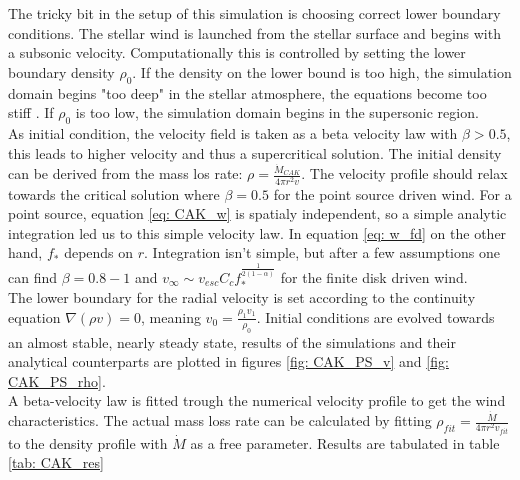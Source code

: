 The tricky bit in the setup of this simulation is choosing correct lower boundary conditions. The stellar wind is launched from the stellar surface and begins with a subsonic velocity. Computationally this is controlled by setting the lower boundary density $\rho_0$. If the density on the lower bound is too high, the simulation domain begins "too deep" in the stellar atmosphere, the equations become too stiff \citep{Sundqvist2013}. If $\rho_0$ is too low, the simulation domain begins in the supersonic region.\\

As initial condition, the velocity field is taken as a beta velocity law with $\beta > 0.5$, this leads to higher velocity and thus a supercritical solution. The initial density can be derived from the mass los rate: $\rho = \frac{\dot{M}_{CAK}}{4\pi r^2 v}$. The velocity profile should relax towards the critical solution where $\beta = 0.5$ for the point source driven wind. For a point source, equation \eqref{eq: CAK_w} is spatialy independent, so a simple analytic integration led us to this simple velocity law. In equation \eqref{eq: w_fd} on the other hand, $f_*$ depends on $r$. Integration isn't simple, but after a few assumptions one can find $\beta = 0.8-1$ and $v_{\infty} \sim v_{esc} C_c f_*^{\frac{1}{2(1-\alpha)}} $ \citep{Owocki2003} for the finite disk driven wind. \\

The lower boundary for the radial velocity is set according to the continuity equation $\nabla (\rho v) = 0$, meaning $v_0 = \frac{\rho_1 v_1}{\rho_0}$. Initial conditions are evolved towards an almost stable, nearly steady state, results of the simulations and their analytical counterparts are plotted in figures \ref{fig: CAK_PS_v} and \ref{fig: CAK_PS_rho}.\\

A beta-velocity law is fitted trough the numerical velocity profile to get the wind characteristics. The actual mass loss rate can be calculated by fitting $\rho_{fit} = \frac{\dot{M}}{4\pi r^2 v_{fit}}$ to the density profile with $\dot{M}$ as a free parameter. Results are tabulated in table \ref{tab: CAK_res}

